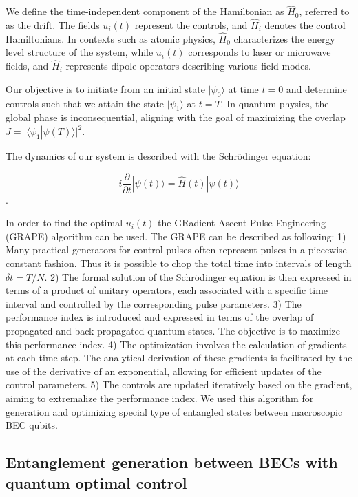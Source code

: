 \documentclass[
aps,%
12pt,%
final,%
notitlepage,%
oneside,%
onecolumn,%
nobibnotes,%
nofootinbib,%
superscriptaddress,%
noshowpacs,%
centertags]%
{revtex4}
\begin{document}
We define the time-independent component of the Hamiltonian as $\hat{H}_0$, referred to as the drift. The fields $u_i(t)$ represent the controls, and $\hat{H}_i$ denotes the control Hamiltonians. In contexts such as atomic physics, $\hat{H}_0$ characterizes the energy level structure of the system, while $u_i(t)$ corresponds to laser or microwave fields, and $\hat{H}_i$ represents dipole operators describing various field modes.



Our objective is to initiate from an initial state $|\psi_0\rangle$ at time $t = 0$ and determine controls such that we attain the state $|\psi_1\rangle$ at $t = T$. In quantum physics, the global phase is inconsequential, aligning with the goal of maximizing the overlap $J = |\langle \psi_1 | \psi(T)\rangle|^2$.

The dynamics of our system is described with the Schrödinger equation:

$$i \frac{\partial}{\partial t} |\psi(t)\rangle = \hat{H}(t) |\psi(t)\rangle$$.

In order to find the optimal $u_i(t)$ the GRadient Ascent Pulse Engineering (GRAPE) algorithm \cite{Khaneja2005} can be used. The GRAPE can be described as following: 1) Many practical generators for control pulses often represent pulses in a piecewise constant fashion. Thus it is possible to chop the total time into intervals of length $\delta t = T/N$. 2) The formal solution of the Schrödinger equation is then expressed in terms of a product of unitary operators, each associated with a specific time interval and controlled by the corresponding pulse parameters. 3) The performance index is introduced and expressed in terms of the overlap of propagated and back-propagated quantum states. The objective is to maximize this performance index. 4) The optimization involves the calculation of gradients at each time step. The analytical derivation of these gradients is facilitated by the use of the derivative of an exponential, allowing for efficient updates of the control parameters. 5) The controls are updated iteratively based on the gradient, aiming to extremalize the performance index. We used this algorithm for generation and optimizing special type of entangled states between macroscopic BEC qubits.

\subsection{Entanglement generation between BECs with quantum optimal control}
\end{document}

